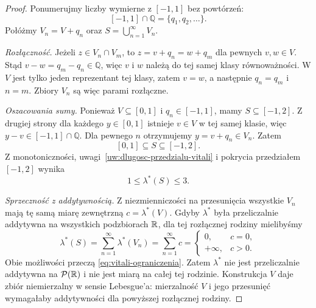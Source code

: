 \begin{proof}
Ponumerujmy liczby wymierne z $[-1,1]$ bez powtórzeń:
\[
  [-1,1]\cap\mathbb{Q}=\{q_1,q_2,\ldots\}.
\]
Połóżmy $V_n=V+q_n$ oraz $S=\bigcup_{n=1}^{\infty}V_n$.

\emph{Rozłączność.}
Jeżeli $z\in V_n\cap V_m$, to $z=v+q_n=w+q_m$ dla pewnych $v,w\in V$.
Stąd $v-w=q_m-q_n\in\mathbb{Q}$, więc $v$ i $w$ należą do tej samej
klasy równoważności. W $V$ jest tylko jeden reprezentant tej klasy,
zatem $v=w$, a następnie $q_n=q_m$ i $n=m$.
Zbiory $V_n$ są więc parami rozłączne.

\emph{Oszacowania sumy.}
Ponieważ $V\subseteq[0,1]$ i $q_n\in[-1,1]$, mamy $S\subseteq[-1,2]$.
Z drugiej strony dla każdego $y\in[0,1]$ istnieje $v\in V$ w tej samej
klasie, więc $y-v\in[-1,1]\cap\mathbb{Q}$. Dla pewnego $n$ otrzymujemy
$y=v+q_n\in V_n$. Zatem
\[
  [0,1]\subseteq S\subseteq[-1,2].
\]
Z monotoniczności, uwagi~\ref{uw:dlugosc-przedzialu-vitali}
i pokrycia przedziałem $[-1,2]$ wynika
\begin{equation}
  1\leq\lambda^{\ast}(S)\leq3.
  \label{eq:vitali-ograniczenia}
\end{equation}

\emph{Sprzeczność z addytywnością.}
Z niezmienniczości na przesunięcia wszystkie $V_n$ mają tę samą miarę
zewnętrzną $c=\lambda^{\ast}(V)$.
Gdyby $\lambda^{\ast}$ była przeliczalnie addytywna na wszystkich
podzbiorach $\mathbb{R}$, dla tej rozłącznej rodziny mielibyśmy
\[
  \lambda^{\ast}(S)=\sum_{n=1}^{\infty}\lambda^{\ast}(V_n)
    =\sum_{n=1}^{\infty}c
    =\begin{cases}
      0, & c=0,\\
      +\infty, & c>0.
    \end{cases}
\]
Obie możliwości przeczą \eqref{eq:vitali-ograniczenia}.
Zatem $\lambda^{\ast}$ nie jest przeliczalnie addytywna na
$\mathcal{P}(\mathbb{R})$ i nie jest miarą na całej tej rodzinie.
Konstrukcja $V$ daje zbiór niemierzalny w sensie Lebesgue'a:
mierzalność $V$ i jego przesunięć wymagałaby addytywności
dla powyższej rozłącznej rodziny.
\end{proof}
\znaczniklimbo
